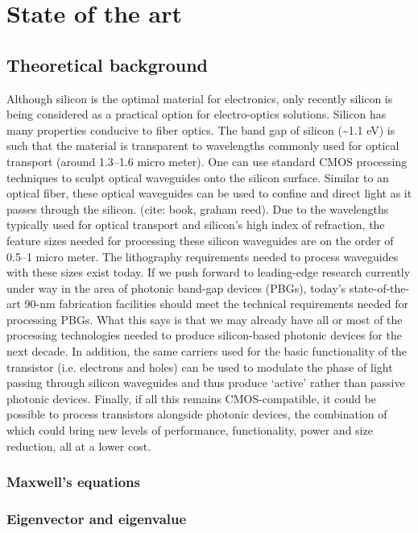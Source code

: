 \documentclass[../report.tex]{subfiles}
\begin{document}
	
	
\chapter{State of the art}

	\section{Theoretical background}
Although silicon is the optimal material for electronics, only recently silicon is being considered as a practical option for electro-optics solutions. Silicon has many properties conducive to fiber optics. The band gap of silicon (\textasciitilde1.1 eV) is such that the material is transparent to wavelengths commonly used for optical transport (around 1.3–1.6 micro meter). One can use standard CMOS processing techniques to sculpt optical waveguides onto the silicon surface. Similar to an optical fiber, these optical waveguides can be used to confine and direct light as it passes through the silicon. (cite: book, graham reed). Due to the wavelengths typically used for optical transport and silicon’s high index of refraction, the feature sizes needed for processing these silicon waveguides are on the order of 0.5–1 micro meter. The lithography requirements needed to process waveguides with these sizes exist today. If we push forward to leading-edge research currently under way in the area of photonic band-gap devices (PBGs), today’s state-of-the-art 90-nm fabrication facilities should meet the technical requirements needed for processing PBGs. What this says is that we may already have all or most of the processing technologies needed to produce silicon-based photonic devices for the next decade. In addition, the same carriers used for the basic functionality of the transistor (i.e. electrons and holes) can be used to modulate the phase of light passing through silicon waveguides and thus produce ‘active’ rather than passive photonic devices. Finally, if all this remains CMOS-compatible, it could be possible to process transistors alongside photonic devices, the combination of which could bring new levels of performance, functionality, power and size reduction, all at a lower cost.
		
		\subsection{Maxwell's equations}

		\subsection{Eigenvector and eigenvalue}
				
\end{document}
